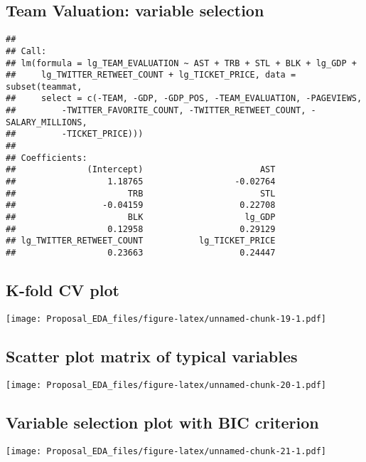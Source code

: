 \documentclass[12pt,]{article}
\begin{document}
\subsection{Team Valuation: variable selection}\label{VSR}

\begin{verbatim}
## 
## Call:
## lm(formula = lg_TEAM_EVALUATION ~ AST + TRB + STL + BLK + lg_GDP + 
##     lg_TWITTER_RETWEET_COUNT + lg_TICKET_PRICE, data = subset(teammat, 
##     select = c(-TEAM, -GDP, -GDP_POS, -TEAM_EVALUATION, -PAGEVIEWS, 
##         -TWITTER_FAVORITE_COUNT, -TWITTER_RETWEET_COUNT, -SALARY_MILLIONS, 
##         -TICKET_PRICE)))
## 
## Coefficients:
##              (Intercept)                       AST  
##                  1.18765                  -0.02764  
##                      TRB                       STL  
##                 -0.04159                   0.22708  
##                      BLK                    lg_GDP  
##                  0.12958                   0.29129  
## lg_TWITTER_RETWEET_COUNT           lg_TICKET_PRICE  
##                  0.23663                   0.24447
\end{verbatim}

\subsection{K-fold CV plot}\label{KCV}

\texttt{[image: Proposal\_EDA\_files/figure-latex/unnamed-chunk-19-1.pdf]}

\subsection{Scatter plot matrix of typical variables}\label{SPM}

\texttt{[image: Proposal\_EDA\_files/figure-latex/unnamed-chunk-20-1.pdf]}

\subsection{Variable selection plot with BIC criterion}\label{BIC2}

\texttt{[image: Proposal\_EDA\_files/figure-latex/unnamed-chunk-21-1.pdf]}
\end{document}
